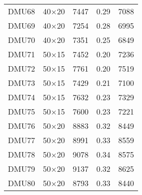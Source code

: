 \begin{table}[H]
\begin{tabular}{@{}ccccc@{}}
DMU68 & 40$\times$20 & 7447 & 0.29 & 7088\\ 
DMU69 & 40$\times$20 & 7254 & 0.28 & 6995\\ 
DMU70 & 40$\times$20 & 7351 & 0.25 & 6849\\ 
DMU71 & 50$\times$15 & 7452 & 0.20 & 7236\\ 
DMU72 & 50$\times$15 & 7761 & 0.20 & 7519\\ 
DMU73 & 50$\times$15 & 7429 & 0.21 & 7100\\ 
DMU74 & 50$\times$15 & 7632 & 0.23 & 7329\\ 
DMU75 & 50$\times$15 & 7600 & 0.23 & 7221\\ 
DMU76 & 50$\times$20 & 8883 & 0.32 & 8449\\ 
DMU77 & 50$\times$20 & 8991 & 0.33 & 8559\\ 
DMU78 & 50$\times$20 & 9078 & 0.34 & 8575\\ 
DMU79 & 50$\times$20 & 9137 & 0.32 & 8625\\ 
DMU80 & 50$\times$20 & 8793 & 0.33 & 8440\\ \bottomrule
\end{tabular}
\end{table}

